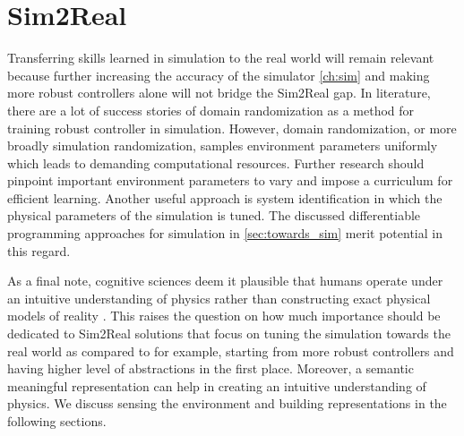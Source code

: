 \documentclass[\home/main.tex]{subfiles}
\begin{document}
\section{Sim2Real}
Transferring skills learned in simulation to the real world will remain relevant because further increasing  the accuracy of the simulator \cref{ch:sim} and making more robust controllers alone will not bridge the Sim2Real gap. In literature, there are a lot of success stories of domain randomization as a method for training robust controller in simulation. However, domain randomization, or more broadly simulation randomization, samples environment parameters uniformly which leads to demanding computational resources. Further research should pinpoint important environment parameters to vary and impose a curriculum for efficient learning. Another useful approach is system identification in which the physical parameters of the simulation is tuned. The discussed differentiable programming approaches for simulation in \cref{sec:towards_sim} merit potential in this regard. 

As a final note, cognitive sciences deem it plausible that humans operate under an intuitive understanding of physics rather than constructing exact physical models of reality \autocite{Baillargeon2011}. This raises the question on how much importance should be dedicated to Sim2Real solutions  that focus on tuning the simulation towards the real world as compared to for example, starting from more robust controllers  and having higher level of abstractions  in the first place. Moreover, a semantic meaningful representation can help in creating an intuitive understanding of physics. We discuss sensing the environment and building representations in the following sections.  
\end{document}
